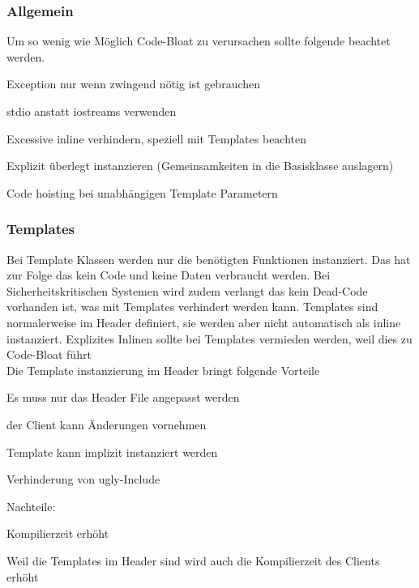 \subsubsection{Allgemein}
Um so wenig wie Möglich Code-Bloat zu verursachen sollte folgende beachtet werden.
\begin{compactitem}
    \item Exception nur wenn zwingend nötig ist gebrauchen
    \item stdio anstatt iostreams verwenden
    \item Excessive inline verhindern, speziell mit Templates beachten
    \item Explizit überlegt instanzieren (Gemeinsamkeiten in die Basisklasse auslagern)
    \item Code hoisting bei unabhängigen Template Parametern
\end{compactitem}

\subsubsection{Templates}
Bei Template Klassen werden nur die benötigten Funktionen instanziert. Das hat zur Folge das kein Code und keine Daten verbraucht werden. Bei Sicherheitskritischen Systemen wird zudem verlangt das kein Dead-Code vorhanden ist, was mit Templates verhindert werden kann. Templates sind normalerweise im Header definiert, sie werden aber nicht automatisch als inline instanziert. Explizites Inlinen sollte bei Templates vermieden werden, weil dies zu Code-Bloat führt\\

Die Template instanzierung im Header bringt folgende Vorteile
\begin{compactitem}
    \item Es muss nur das Header File angepasst werden
    \item der Client kann Änderungen vornehmen
    \item Template kann implizit instanziert werden
    \item Verhinderung von ugly-Include
\end{compactitem}

Nachteile:
\begin{compactitem}
    \item Kompilierzeit erhöht
    \item Weil die Templates im Header sind wird auch die Kompilierzeit des Clients erhöht
\end{compactitem}


